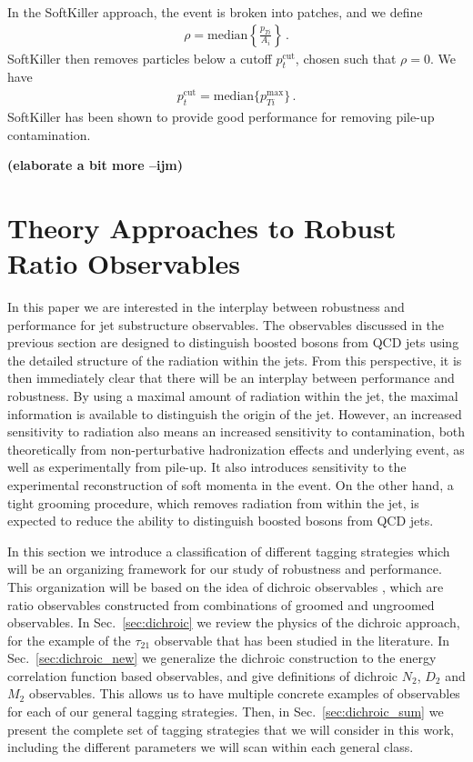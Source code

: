 \documentclass[11pt,letterpaper]{article}
\DeclareRobustCommand{\Sec}[1]{Sec.~\ref{#1}}
\newcommand{\ijm}[1]{\textbf{\textcolor{llblue}{(#1 --ijm)}}}
\begin{document}
In the SoftKiller approach, the event is broken into patches, and we define
\begin{align}
\rho= \text{median} \left \{ \frac{p_{Ti}}{A_i}   \right \}\,.
\end{align}
SoftKiller then removes particles below a cutoff $p_t^{\text{cut}}$, chosen such that $\rho=0$. We have
\begin{align}
p_t^{\text{cut}}=\text{median} \{ p_{Ti}^{\text{max}} \}\,.
\end{align}
SoftKiller has been shown to provide good performance for removing pile-up contamination.

\ijm{elaborate a bit more}

\section{Theory Approaches to Robust Ratio Observables}\label{sec:hybrid_ratio}









In this paper we are interested in the interplay between robustness and performance for jet substructure observables. The observables discussed in the previous section are designed to distinguish boosted bosons from QCD jets using the detailed structure of the radiation within the jets. From this perspective, it is then immediately clear that there will be an interplay between performance and robustness. By using a maximal amount of radiation within the jet, the maximal information is available to distinguish the origin of the jet.  However, an increased sensitivity to radiation also means an increased sensitivity to contamination, both theoretically from non-perturbative hadronization effects and underlying event, as well as experimentally from pile-up. It also introduces sensitivity to the experimental reconstruction of soft momenta in the event. On the other hand, a tight grooming procedure, which removes radiation from within the jet, is expected to reduce the ability to distinguish boosted bosons from QCD jets.

In this section we introduce a classification of different tagging strategies which will be an organizing framework for our study of robustness and performance. This organization will be based on the idea of dichroic observables \cite{Salam:2016yht}, which are ratio observables constructed from combinations of groomed and ungroomed observables. In \Sec{sec:dichroic} we review the physics of the dichroic approach, for the example of the $\tau_{21}$ observable that has been studied in the literature. In \Sec{sec:dichroic_new} we generalize the dichroic construction to the energy correlation function based observables, and give definitions of dichroic $N_2$, $D_2$ and $M_2$ observables. This allows us to have multiple concrete examples of observables for each of our general tagging strategies. Then, in \Sec{sec:dichroic_sum} we present the complete set of tagging strategies that we will consider in this work, including the different parameters we will scan within each general class.
\end{document}
